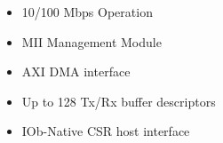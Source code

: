 \begin{itemize}
\item 10/100 Mbps Operation
\item MII Management Module
\item AXI DMA interface
\item Up to 128 Tx/Rx buffer descriptors
\item IOb-Native CSR host interface
\end{itemize}
